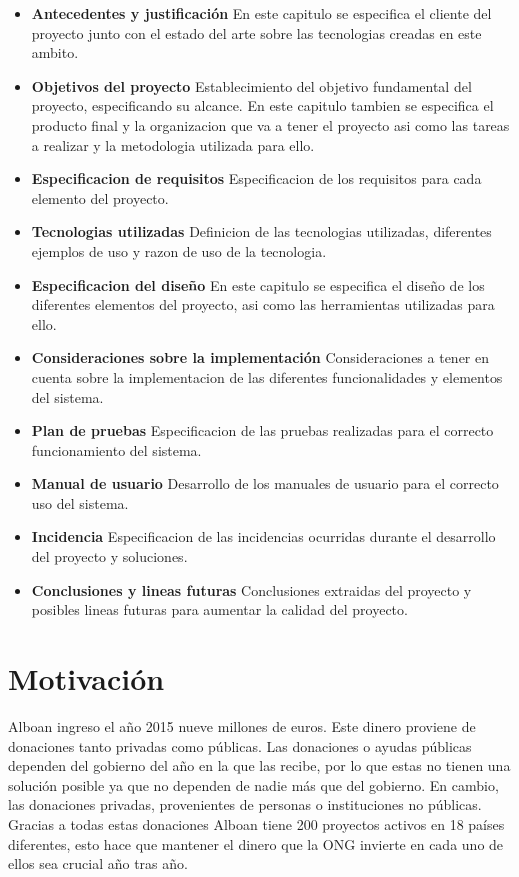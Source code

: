 \begin{itemize}
	\item \textbf{Antecedentes y justificación}\smallbreak
	En este capitulo se especifica el cliente del proyecto junto con el estado del arte sobre las tecnologias creadas en este ambito.
	\item \textbf{Objetivos del proyecto}\smallbreak
	Establecimiento del objetivo fundamental del proyecto, especificando su alcance. En este capitulo tambien se especifica el producto final y la organizacion que va a tener el proyecto asi como las tareas a realizar y la metodologia utilizada para ello. 
	\item \textbf{Especificacion de requisitos}\smallbreak
	Especificacion de los requisitos para cada elemento del proyecto.
	\item \textbf{Tecnologias utilizadas} \smallbreak
	Definicion de las tecnologias utilizadas, diferentes ejemplos de uso y razon de uso de la tecnologia.	
	\item \textbf{Especificacion del diseño} \smallbreak
	En este capitulo se especifica el diseño de los diferentes elementos del proyecto, asi como las herramientas utilizadas para ello.
	\item \textbf{Consideraciones sobre la implementación} \smallbreak
	Consideraciones a tener en cuenta sobre la implementacion de las diferentes funcionalidades y elementos del sistema.
	\item \textbf{Plan de pruebas} \smallbreak
	Especificacion de las pruebas realizadas para el correcto funcionamiento del sistema.
	\item \textbf{Manual de usuario} \smallbreak
	Desarrollo de los manuales de usuario para el correcto uso del sistema.
	\item \textbf{Incidencia} \smallbreak
	Especificacion de las incidencias ocurridas durante el desarrollo del proyecto y soluciones.
	\item \textbf{Conclusiones y lineas futuras} \smallbreak
	Conclusiones extraidas del proyecto y posibles lineas futuras para aumentar la calidad del proyecto.
\end{itemize}

\section{Motivación}
Alboan ingreso el año 2015 nueve millones de euros. Este dinero proviene de donaciones tanto privadas como públicas. Las donaciones o ayudas públicas dependen del gobierno del año en la que las recibe, por lo que estas no tienen una solución posible ya que no dependen de nadie más que del gobierno. En cambio, las donaciones privadas, provenientes de personas o instituciones no públicas. Gracias a todas estas donaciones Alboan tiene 200 proyectos activos en 18 países diferentes, esto hace que mantener el dinero que la ONG invierte en cada uno de ellos sea crucial año tras año. \\

